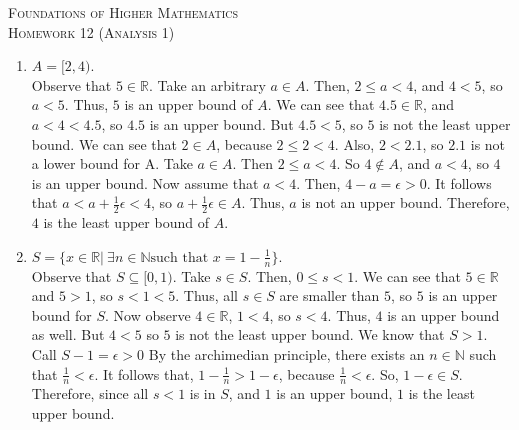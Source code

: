 \documentclass{article}
\theoremstyle{problem}
\theoremstyle{plain}
\theoremstyle{remark}
\begin{document}
\begin{center}
  \textsc{\Large Foundations of Higher Mathematics}\\[.3cm]
  \textsc{\Large Homework 12 (Analysis 1)}
\end{center}

\begin{enumerate}
\item $A = [2,4)$.\\
  Observe that $5 \in \mathbb{R}$.
  Take an arbitrary $a \in A$.
  Then, $2 \leq a < 4$, and $4 < 5$, so $a < 5$.
  Thus, $5$ is an upper bound of $A$.
  We can see that $4.5 \in \mathbb{R}$, and $a < 4 < 4.5$, so $4.5$ is an upper bound.
  But $4.5 < 5$, so $5$ is not the least upper bound.
  We can see that $2 \in A$, because $2 \leq 2 < 4$.
  Also, $2 < 2.1$, so $2.1$ is not a lower bound for A.
  Take $a \in A$. Then $2 \leq a < 4$. So $4 \not \in A$, and $a < 4$, so $4$ is an upper bound.
  Now assume that $a < 4$.
  Then, $4 - a = \epsilon > 0$.
  It follows that $a < a + \frac{1}{2} \epsilon < 4$, so $a + \frac{1}{2} \epsilon \in A$.  
  Thus, $a$ is not an upper bound.
  Therefore, $4$ is the least upper bound of $A$.

\item $S = \{x \in \mathbb{R}|\ \exists n \in \mathbb{N} \text{such that } x = 1 - \frac{1}{n}\}$.\\
  Observe that $S \subseteq [0,1)$. %
    Take $s \in S$.
    Then, $0 \leq s < 1$.
    We can see that $5 \in \mathbb{R}$ and $5 > 1$, so $s < 1 < 5$.
    Thus, all $s \in S$ are smaller than $5$, so $5$ is an upper bound for $S$.
    Now observe $4 \in \mathbb{R}$, $1 < 4$, so $s < 4$.
    Thus, $4$ is an upper bound as well.
    But $4 < 5$ so $5$ is not the least upper bound.
    We know that $S > 1$.
    Call $S - 1 = \epsilon > 0$
    By the archimedian principle, there exists an $n \in \mathbb{N}$ such that $\frac{1}{n} < \epsilon$.
    It follows that, $1 - \frac{1}{n} > 1 - \epsilon$, because $\frac{1}{n} < \epsilon$.
    So, $1 - \epsilon \in S$.
    Therefore, since all $s < 1$ is in $S$, and $1$ is an upper bound, $1$ is the least upper bound.
    

\end{enumerate}
\end{document}
